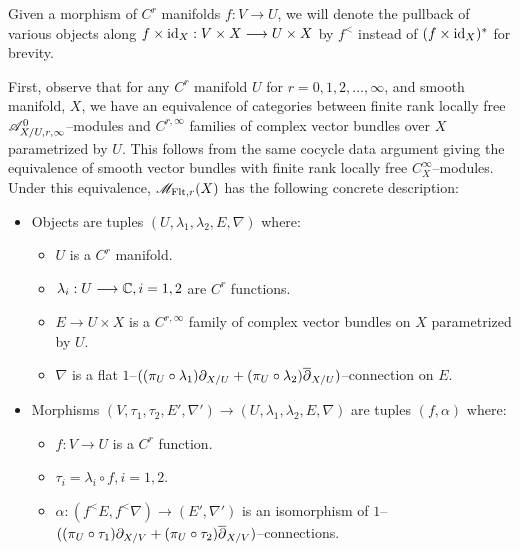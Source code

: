 \documentclass[11pt]{amsart}
\begin{document}
\begin{notn}
Given a morphism of $C^r$ manifolds $f : V \to U$, we will denote the pullback of various
objects along $f \times \id_X : V \times X \to U \times X$ by $f^<$ instead of
$(f \times \mathrm{id}_X)^*$ for brevity.
\end{notn}

\begin{rmk}\label{rmk:M-flt-r-concrete}
First, observe that for any $C^r$ manifold $U$ for $r = 0, 1, 2, \dots, \infty$,
and smooth manifold, $X$, we have an equivalence of categories between finite rank locally free
$\mathscr{A}_{X/U, r, \infty}^0$--modules and $C^{r, \infty}$ families of complex vector bundles over $X$
parametrized by $U$. This follows from the same cocycle data argument giving the equivalence of
smooth vector bundles with finite rank locally free $C^\infty_X$--modules.
Under this equivalence, $\mathscr{M}_{\mathrm{Flt}, r}(X)$ has the following concrete description:
\begin{itemize}
\item Objects are tuples $(U, \lambda_1, \lambda_2, E, \nabla)$ where:
    \begin{itemize}
    \item $U$ is a $C^r$ manifold.
    \item $\lambda_i : U \to \bC, i = 1, 2$ are $C^r$ functions.
    \item $E \to U \times X$ is a $C^{r, \infty}$ family of complex vector bundles on $X$
    parametrized by $U$.
    \item $\nabla$ is a flat
    $1$--$((\pi_U \circ \lambda_1)\partial_{X/U} + (\pi_U \circ \lambda_2)\overline{\partial}_{X/U})$--connection on
    $E$.
    \end{itemize}
\item Morphisms $(V, \tau_1, \tau_2, E', \nabla') \to (U, \lambda_1, \lambda_2, E, \nabla)$ are
    tuples $(f, \alpha)$ where:
    \begin{itemize}
    \item $f : V \to U$ is a $C^r$ function.
    \item $\tau_i = \lambda_i \circ f, i = 1, 2$.
    \item $\alpha : (f^<E, f^<\nabla) \to (E', \nabla')$ is an isomorphism of
    $1$--$((\pi_U \circ \tau_1)\partial_{X/V} + (\pi_U \circ \tau_2)\overline{\partial}_{X/V})$--connections.
    \end{itemize}
\end{itemize}
\end{rmk}
\end{document}
